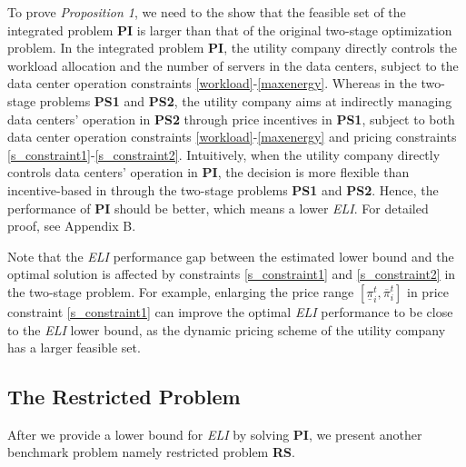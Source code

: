 \documentclass[journal]{IEEEtran}
\begin{document}
	To prove \emph{Proposition 1}, we need to the show that the feasible set of the integrated problem \textbf{PI} is larger than that of the original two-stage optimization problem. In the integrated problem \textbf{PI}, the utility company directly controls the workload allocation and the number of servers in the data centers, subject to the data center operation constraints \eqref{workload}-\eqref{maxenergy}. Whereas in the two-stage problems \textbf{PS1} and \textbf{PS2}, the utility company aims at indirectly managing data centers' operation in \textbf{PS2} through price incentives in \textbf{PS1}, subject to both data center operation constraints \eqref{workload}-\eqref{maxenergy} and pricing constraints \eqref{s_constraint1}-\eqref{s_constraint2}. Intuitively, when the utility company directly controls data centers' operation in \textbf{PI}, the decision is more flexible than incentive-based in through the two-stage problems \textbf{PS1} and \textbf{PS2}. Hence, the performance of \textbf{PI} should be better, which means a lower \emph{ELI}. For detailed proof, see Appendix B.
	
	Note that the \emph{ELI} performance gap between the estimated lower bound and the optimal solution is affected by constraints \eqref{s_constraint1} and \eqref{s_constraint2} in the two-stage problem. For example, enlarging the price range $[\underline{\pi}_i^t,\overline{\pi}_i^t]$ in price constraint \eqref{s_constraint1} can improve the optimal \emph{ELI} performance to be close to the \emph{ELI} lower bound, as the dynamic pricing scheme of the utility company has a larger feasible set.

	\subsection{The Restricted Problem}
	After we provide a lower bound for \emph{ELI} by solving \textbf{PI}, we present another benchmark problem namely restricted problem \textbf{RS}. 
	
\end{document}
